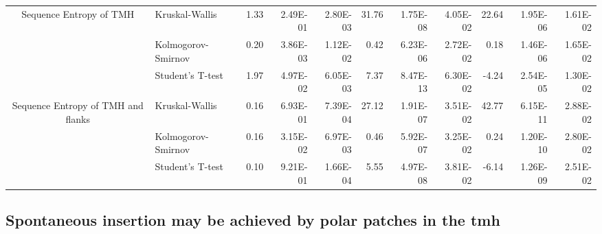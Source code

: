 \begin{table}[htbp]
\begin{tabular}{clrrrrrrrrr}
		\multirow{3}[0]{*}{Sequence Entropy of TMH } &  Kruskal-Wallis & 1.33  & 2.49E-01 & 2.80E-03 & 31.76 & 1.75E-08 & 4.05E-02 & 22.64 & 1.95E-06 & 1.61E-02 \\
								&  Kolmogorov-Smirnov & 0.20  & 3.86E-03 & 1.12E-02 & 0.42  & 6.23E-06 & 2.72E-02 & 0.18  & 1.46E-06 & 1.65E-02 \\
								&  Student's T-test & 1.97  & 4.97E-02 & 6.05E-03 & 7.37  & 8.47E-13 & 6.30E-02 & -4.24 & 2.54E-05 & 1.30E-02 \\
		\multirow{3}[0]{*}{Sequence Entropy of TMH and flanks } &  Kruskal-Wallis & 0.16  & 6.93E-01 & 7.39E-04 & 27.12 & 1.91E-07 & 3.51E-02 & 42.77 & 6.15E-11 & 2.88E-02 \\
								&  Kolmogorov-Smirnov & 0.16  & 3.15E-02 & 6.97E-03 & 0.46  & 5.92E-07 & 3.25E-02 & 0.24  & 1.20E-10 & 2.80E-02 \\
								&  Student's T-test & 0.10  & 9.21E-01 & 1.66E-04 & 5.55  & 4.97E-08 & 3.81E-02 & -6.14 & 1.26E-09 & 2.51E-02 \\
		\end{tabular}%
						\label{table:organellesuniprotstats}
		\end{table}%



\subsection{Spontaneous insertion may be achieved by polar patches in the \gls{tmh}}


